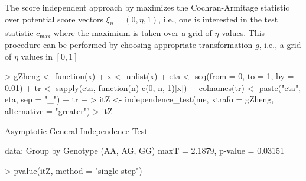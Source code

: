 \documentclass[bimj,fleqn]{w-art}
\begin{document}
The score independent approach by \cite{Zheng:2008} maximizes the
Cochran-Armitage statistic over potential score vectors 
$\xi_\eta = (0, \eta, 1)$, i.e., one is interested in the test statistic
$c_\text{max}$ where the maximium is taken over a grid of $\eta$ values.
This procedure can be performed by choosing appropriate transformation
$g$, i.e., a grid of $\eta$ values in $[0,1]$
\begin{Schunk}
\begin{Sinput}
> gZheng <- function(x) {
+     x <- unlist(x)
+     eta <- seq(from = 0, to = 1, by = 0.01)
+     tr <- sapply(eta, function(n) c(0, n, 1)[x])
+     colnames(tr) <- paste("eta", eta, sep = "_")
+     tr
+ }
> itZ <- independence_test(me, xtrafo = gZheng, alternative = "greater")
> itZ
\end{Sinput}
\begin{Soutput}
	Asymptotic General Independence Test

data:  Group by Genotype (AA, AG, GG) 
maxT = 2.1879, p-value = 0.03151
\end{Soutput}
\end{Schunk}
\begin{Schunk}
\begin{Sinput}
> pvalue(itZ, method = "single-step")
\end{Sinput}
\end{Schunk}
\end{document}
